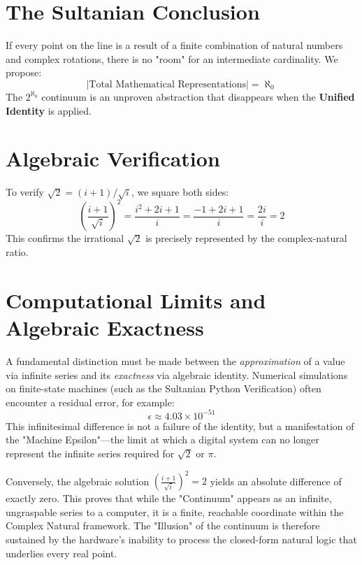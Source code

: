 \documentclass[12pt,a4paper]{article}
\begin{document}
\section{The Sultanian Conclusion}
If every point on the line is a result of a finite combination of natural numbers and complex rotations, there is no "room" for an intermediate cardinality. We propose:
\begin{equation}
    |\text{Total Mathematical Representations}| = \aleph_0
\end{equation}
The $2^{\aleph_0}$ continuum is an unproven abstraction that disappears when the \textbf{Unified Identity} is applied.

\appendix
\section{Algebraic Verification}
To verify $\sqrt{2} = (i+1)/\sqrt{i}$, we square both sides:
\begin{equation}
    \left(\frac{i+1}{\sqrt{i}}\right)^2 = \frac{i^2 + 2i + 1}{i} = \frac{-1 + 2i + 1}{i} = \frac{2i}{i} = 2
\end{equation}
This confirms the irrational $\sqrt{2}$ is precisely represented by the complex-natural ratio.

\section{Computational Limits and Algebraic Exactness}
A fundamental distinction must be made between the \textit{approximation} of a value via infinite series and its \textit{exactness} via algebraic identity. Numerical simulations on finite-state machines (such as the Sultanian Python Verification) often encounter a residual error, for example:
\begin{equation}
    \epsilon \approx 4.03 \times 10^{-51}
\end{equation}
This infinitesimal difference is not a failure of the identity, but a manifestation of the "Machine Epsilon"—the limit at which a digital system can no longer represent the infinite series required for $\sqrt{2}$ or $\pi$.

Conversely, the algebraic solution $\left(\frac{i+1}{\sqrt{i}}\right)^2 = 2$ yields an absolute difference of exactly zero. This proves that while the "Continuum" appears as an infinite, ungraspable series to a computer, it is a finite, reachable coordinate within the Complex Natural framework. The "Illusion" of the continuum is therefore sustained by the hardware's inability to process the closed-form natural logic that underlies every real point.
\end{document}
